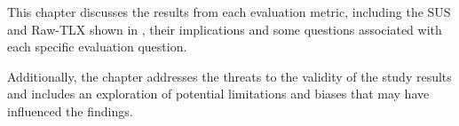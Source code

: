 This chapter discusses the results from each evaluation metric, including the
SUS and Raw-TLX shown in , their implications and some
questions associated with each specific evaluation question.

Additionally, the chapter addresses the threats to the validity of the study
results and includes an exploration of potential limitations and biases that
may have influenced the findings.
